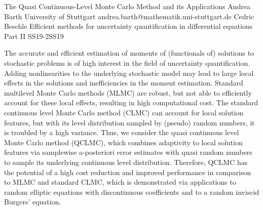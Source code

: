 \begin{talk}
  {The Quasi Continuous-Level Monte Carlo Method and its Applications}%
  {Andrea Barth}%
  {University of Stuttgart}%
  {andrea.barth@mathematik.uni-stuttgart.de}%
  {Cedric Beschle}%
{Efficient methods for uncertainty quantification in differential equations Part II}
{}{SS19-2}{SS19}


				
				

The accurate and efficient estimation of moments of (functionals of) solutions to stochastic problems is of high interest in the field of uncertainty quantification. Adding nonlinearities to the underlying
stochastic model may lead to large local effects in the solutions and inefficiencies in the moment estimation. Standard multilevel Monte Carlo methods (MLMC) are robust, but not able to efficiently account for these local effects, resulting in high computational cost. The standard continuous level Monte Carlo method (CLMC) can account for local solution features, but with its level distribution sampled by (pseudo) random numbers, it is troubled by a high variance. Thus, we consider the quasi continuous level Monte Carlo method (QCLMC), which combines adaptivity to local solution features via samplewise a-posteriori error estimates with quasi random numbers to sample its underlying continuous level distribution. Therefore, QCLMC has the potential of a high cost reduction and improved performance in comparison to MLMC and standard CLMC, which is demonstrated via applications to random elliptic equations with discontinuous coefficients and to a random inviscid Burgers’ equation.

% 

\end{talk}

